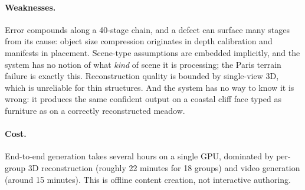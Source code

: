 \paragraph{Weaknesses.}
Error compounds along a 40-stage chain, and a defect can surface many stages from
its cause: object size compression originates in depth calibration and manifests in
placement. Scene-type assumptions are embedded implicitly, and the system has no
notion of what \emph{kind} of scene it is processing; the Paris terrain failure is
exactly this. Reconstruction quality is bounded by single-view 3D, which is
unreliable for thin structures. And the system has no way to know it is wrong: it
produces the same confident output on a coastal cliff face typed as furniture as on
a correctly reconstructed meadow.

\paragraph{Cost.}
End-to-end generation takes several hours on a single GPU, dominated by per-group
3D reconstruction (roughly 22 minutes for 18 groups) and video generation (around
15 minutes). This is offline content creation, not interactive authoring.
